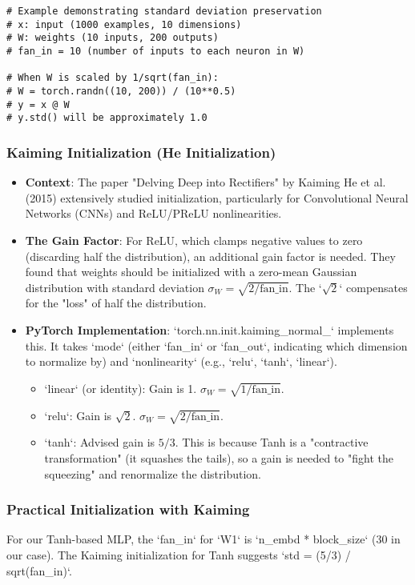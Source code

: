 \begin{lstlisting}
# Example demonstrating standard deviation preservation
# x: input (1000 examples, 10 dimensions)
# W: weights (10 inputs, 200 outputs)
# fan_in = 10 (number of inputs to each neuron in W)

# When W is scaled by 1/sqrt(fan_in):
# W = torch.randn((10, 200)) / (10**0.5)
# y = x @ W
# y.std() will be approximately 1.0
\end{lstlisting}

\subsubsection{Kaiming Initialization (He Initialization)}
\begin{itemize}
    \item \textbf{Context}: The paper "Delving Deep into Rectifiers" by Kaiming He et al. (2015) extensively studied initialization, particularly for Convolutional Neural Networks (CNNs) and ReLU/PReLU nonlinearities.
    \item \textbf{The Gain Factor}: For ReLU, which clamps negative values to zero (discarding half the distribution), an additional gain factor is needed. They found that weights should be initialized with a zero-mean Gaussian distribution with standard deviation $\sigma_W = \sqrt{2 / \text{fan\_in}}$. The `$\sqrt{2}$` compensates for the "loss" of half the distribution.
    \item \textbf{PyTorch Implementation}: `torch.nn.init.kaiming_normal_` implements this. It takes `mode` (either `fan_in` or `fan_out`, indicating which dimension to normalize by) and `nonlinearity` (e.g., `relu`, `tanh`, `linear`).
        \begin{itemize}
            \item `linear` (or identity): Gain is 1. $\sigma_W = \sqrt{1 / \text{fan\_in}}$.
            \item `relu`: Gain is $\sqrt{2}$. $\sigma_W = \sqrt{2 / \text{fan\_in}}$.
            \item `tanh`: Advised gain is $5/3$. This is because Tanh is a "contractive transformation" (it squashes the tails), so a gain is needed to "fight the squeezing" and renormalize the distribution.
        \end{itemize}
\end{itemize}

\subsubsection{Practical Initialization with Kaiming}
For our Tanh-based MLP, the `fan_in` for `W1` is `n_embd * block_size` (30 in our case). The Kaiming initialization for Tanh suggests `std = (5/3) / sqrt(fan_in)`.


